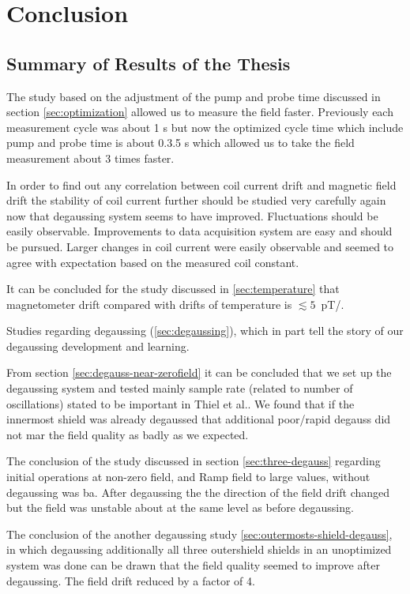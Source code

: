 \chapter{Conclusion\label{ch:conclusion}}
\section{Summary of Results of the Thesis}


The study based on the adjustment of the pump and probe time discussed in section \ref{sec:optimization} allowed us to measure the field faster. Previously  each measurement cycle was about 1 s but now the optimized cycle time which include pump and probe time is about 0.3.5 s which allowed us to take the field measurement about 3 times faster.
  

In order to find out any correlation between coil current drift and magnetic field drift the stability of coil current further should be studied very carefully again now
  that degaussing system seems to have improved.  Fluctuations should
  be easily observable.  Improvements to data acquisition system are easy and should be pursued.  Larger changes in coil current were
  easily observable and seemed to agree with expectation based on the
  measured coil constant.
  
  
It can be concluded for the study discussed in \ref{sec:temperature}  that  magnetometer drift compared with drifts of temperature is $\lesssim 5$~pT/.

Studies regarding degaussing (\ref{sec:degaussing}), which in part tell the story of our
  degaussing development and learning.  
  
From section \ref{sec:degauss-near-zerofield} it can be concluded that we set up the degaussing system and tested mainly sample rate (related
to number of oscillations) stated to be important in Thiel et
al.\cite{doi:10.1063/1.2713433}.  We found that if the innermost shield
was already degaussed that additional poor/rapid degauss did not mar
the field quality as badly as we expected.

 The conclusion of the study discussed in section \ref{sec:three-degauss} regarding initial operations at non-zero field, and Ramp field to large values, without degaussing was ba.  After degaussing  the  the direction of the field drift changed but the field was unstable about  at the same level as before degaussing. 
    
      
The conclusion of the another degaussing study  \ref{sec:outermosts-shield-degauss}, in which degaussing additionally
      all three outershield shields in an unoptimized system was
      done can be drawn that the field quality seemed to improve after degaussing. The field drift reduced by a factor of 4.
 
